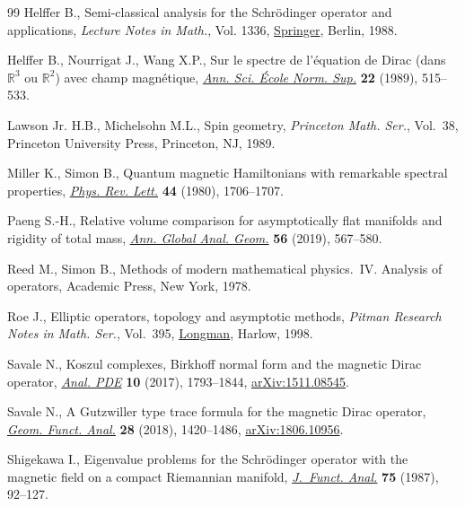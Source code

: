 \begin{thebibliography}{99}
Helffer B., Semi-classical analysis for the {S}chr\"odinger operator and
 applications, \textit{Lecture Notes in Math.}, Vol. 1336, \href{https://doi.org/10.1007/BFb0078115}{Springer}, Berlin,
 1988.

Helffer B., Nourrigat J., Wang X.P., Sur le spectre de l'\'equation de {D}irac
 (dans {${\mathbb R}^3$} ou {${\mathbb R}^2$}) avec champ magn\'etique,
 \href{https://doi.org/10.24033/asens.1591}{\textit{Ann. Sci. \'Ecole Norm. Sup.}} \textbf{22} (1989), 515--533.

Lawson Jr. H.B., Michelsohn M.L., Spin geometry, \textit{Princeton Math. Ser.},
 Vol.~38, Princeton University Press, Princeton, NJ, 1989.

Miller K., Simon B., Quantum magnetic {H}amiltonians with remarkable spectral
 properties, \href{https://doi.org/10.1103/PhysRevLett.44.1706}{\textit{Phys. Rev. Lett.}} \textbf{44} (1980), 1706--1707.

Paeng S.-H., Relative volume comparison for asymptotically flat manifolds and
 rigidity of total mass, \href{https://doi.org/10.1007/s10455-019-09679-4}{\textit{Ann. Global Anal. Geom.}} \textbf{56} (2019),
 567--580.

Reed M., Simon B., Methods of modern mathematical physics.~{IV}. {A}nalysis of
 operators, Academic Press, New York, 1978.

Roe J., Elliptic operators, topology and asymptotic methods, \textit{Pitman
 Research Notes in Math. Ser.}, Vol.~395, \href{https://doi.org/10.1201/b16418}{Longman}, Harlow, 1998.

Savale N., Koszul complexes, {B}irkhoff normal form and the magnetic {D}irac
 operator, \href{https://doi.org/10.2140/apde.2017.10.1793}{\textit{Anal. PDE}} \textbf{10} (2017), 1793--1844,
 \href{https://arxiv.org/abs/1511.08545}{arXiv:1511.08545}.

Savale N., A {G}utzwiller type trace formula for the magnetic {D}irac operator,
 \href{https://doi.org/10.1007/s00039-018-0462-y}{\textit{Geom. Funct. Anal.}} \textbf{28} (2018), 1420--1486,
 \href{https://arxiv.org/abs/1806.10956}{arXiv:1806.10956}.

Shigekawa I., Eigenvalue problems for the {S}chr\"odinger operator with the
 magnetic field on a compact {R}iemannian manifold, \href{https://doi.org/10.1016/0022-1236(87)90108-X}{\textit{J.~Funct. Anal.}}
 \textbf{75} (1987), 92--127.


\end{thebibliography}
